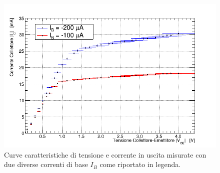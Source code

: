 \documentclass[a4paper,11pt]{article}
\begin{document}
\begin{figure}[h!]
  \centering
  \includegraphics[width = 0.7\linewidth]{../analisi_dati/IVdati.png}
  \caption{Curve caratteristiche di tensione e corrente in uscita misurate con due diverse correnti di base $I_B$ come riportato in legenda. }
\end{figure}
\end{document}
